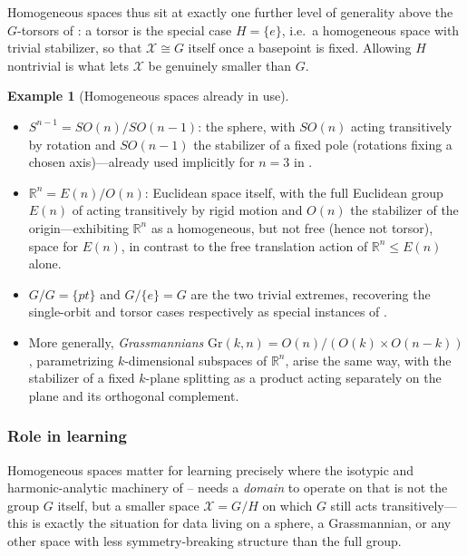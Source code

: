 \documentclass[11pt]{article}
\theoremstyle{plain}
\theoremstyle{definition}
\newtheorem{Example}{Example}[section]
\begin{document}
Homogeneous spaces thus sit at exactly one further level of generality above
the $G$-torsors of : a torsor is the
special case $H = \{e\}$, i.e.\ a homogeneous space with trivial stabilizer,
so that $\mathcal{X} \cong G$ itself once a basepoint is fixed. Allowing $H$ nontrivial
is what lets $\mathcal{X}$ be genuinely smaller than $G$.

\begin{Example}[Homogeneous spaces already in use]
\label{ex:homogeneous-spaces}
\begin{itemize}
    \item $S^{n-1} = SO(n)/SO(n-1)$: the sphere, with $SO(n)$ acting
    transitively by rotation and $SO(n-1)$ the stabilizer of a fixed pole
    (rotations fixing a chosen axis)---already used implicitly for $n=3$ in
    .
    \item $\mathbb{R}^n = E(n) / O(n)$: Euclidean space itself, with the
    full Euclidean group $E(n)$ of 
    acting transitively by rigid motion and $O(n)$ the stabilizer of the
    origin---exhibiting $\mathbb{R}^n$ as a homogeneous, but not free
    (hence not torsor), space for $E(n)$, in contrast to the free
    translation action of $\mathbb{R}^n \leq E(n)$ alone.
    \item $G/G = \{pt\}$ and $G/\{e\} = G$ are the two trivial extremes,
    recovering the single-orbit and torsor cases respectively as special
    instances of .
    \item More generally, \emph{Grassmannians} $\mathrm{Gr}(k,n) =
    O(n)/(O(k)\times O(n-k))$, parametrizing $k$-dimensional subspaces of
    $\mathbb{R}^n$, arise the same way, with the stabilizer of a fixed
    $k$-plane splitting as a product acting separately on the plane and its
    orthogonal complement.
\end{itemize}
\end{Example}

\subsubsection{Role in learning}
\label{subsubsec:homogeneous-spaces-learning}

Homogeneous spaces matter for learning precisely where the isotypic and
harmonic-analytic machinery of
--
needs a \emph{domain} to operate on that is not the group $G$ itself, but a
smaller space $\mathcal{X} = G/H$ on which $G$ still acts transitively---this is
exactly the situation for data living on a sphere, a Grassmannian, or any
other space with less symmetry-breaking structure than the full group.
\end{document}
